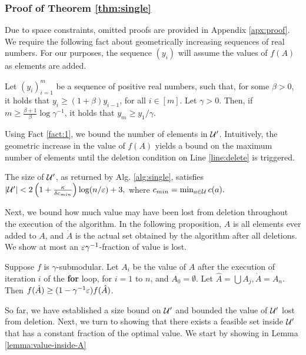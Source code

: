 \subsubsection{Proof of Theorem \ref{thm:single}} \label{sec:single-proofs}
Due to space constraints, omitted proofs are provided in
Appendix \ref{apx:proof}. We require the following fact about geometrically increasing sequences of real
numbers. For our purposes, the sequence $(y_i)$ will assume the values of $f(A)$ as elements are
added. 
\begin{fact} \label{fact:1}
  Let $(y_i)_{i=1}^m$ be a sequence of positive real numbers, such that, for some $\beta > 0$, it holds that $y_i \ge (1 + \beta)y_{i-1}$, for all $i \in [m]$. Let $\gamma > 0$. Then, if $m \ge \frac{\beta + 1}{\beta}\log \gamma^{-1} $, it holds that $y_m \ge y_1 / \gamma$.
\end{fact}
Using Fact \ref{fact:1}, we bound the number of elements in $\mathcal{U}'$. Intuitively, the geometric increase
in the value of $f(A)$ yields a bound on the maximum number of elements until the deletion condition
on Line \ref{line:delete} is triggered. 
\begin{proposition} \label{prop:uprime-size}
  The size of $\mathcal{U}'$, as returned by Alg. \ref{alg:single}, satisfies
  $|\mathcal{U}'| < 2 \left( 1 + \frac{\kappa }{\delta c_{min} } \right) \log ( n / \varepsilon ) + 3,$
  where $c_{min} = \min_{a \in \mathcal{U} } c(a).$
\end{proposition}
Next, we bound how much value may have been lost from deletion throughout the execution
of the algorithm. In the following proposition, $\hat A$ is all elements ever added to
$A$, and $\dot A$ is the actual set obtained by the algorithm after all deletions. We
show at most an $\varepsilon\gamma^{-1}$-fraction of value is lost. 
\begin{proposition} \label{prop:ahat-adot}
  Suppose $f$ is $\gamma$-submodular.
  Let $A_i$ be the value of $A$ after the execution of iteration $i$ of the \textbf{for} loop,
  for $i = 1$ to $n$, and $A_0 = \emptyset$. 
  Let $\hat A = \bigcup A_j, \dot A = A_n$. Then $f( \dot A ) \ge (1 - \gamma^{-1} \varepsilon )f( \hat A)$. 
\end{proposition}
So far, we have established a size bound on $\mathcal{U}'$ and bounded the value of
$\mathcal{U}'$ lost from deletion. Next, we turn to showing that there exists a feasible set
inside $\mathcal{U}'$ that has a constant fraction of the optimal value.
We start by showing in Lemma \ref{lemma:value-inside-A}
